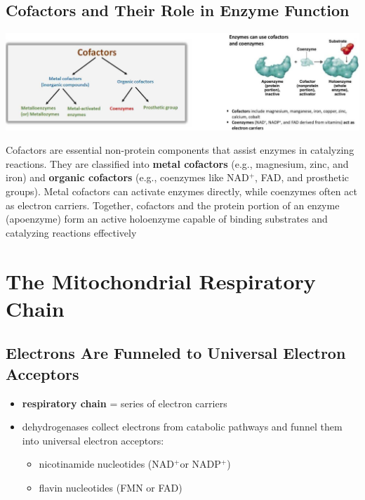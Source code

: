\documentclass[10pt]{article}
\newcommand{\pc}{$^+$}
\begin{document}
\subsection*{Cofactors and Their Role in Enzyme Function}
\begin{center} 
	\includegraphics*[width=\textwidth]{L1_6.png}
\end{center}
Cofactors are essential non-protein components that assist enzymes in catalyzing reactions.  They are classified into \textbf{metal cofactors} (e.g., magnesium, zinc, and iron) and \textbf{organic cofactors} (e.g., coenzymes like NAD\pc, FAD, and prosthetic groups).  Metal cofactors can activate enzymes directly, while coenzymes often act as electron carriers.  Together, cofactors and the protein portion of an enzyme (apoenzyme) form an active holoenzyme capable of binding substrates and catalyzing reactions effectively

\pagebreak
\section*{The Mitochondrial Respiratory Chain}
\subsection*{Electrons Are Funneled to Universal Electron Acceptors}
\begin{itemize}
	\item \textbf{respiratory chain} = series of electron carriers
    \item dehydrogenases collect electrons from catabolic pathways and funnel them into universal electron acceptors:
    \begin{itemize}
        \item nicotinamide nucleotides (NAD\pc or NADP\pc)
        \item flavin nucleotides (FMN or FAD)
    \end{itemize}
\end{itemize}
\end{document}
